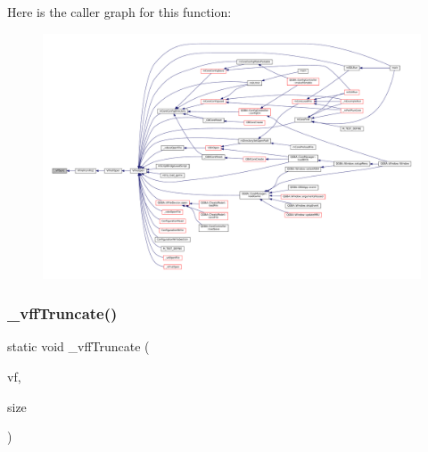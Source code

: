 Here is the caller graph for this function\+:
\nopagebreak
\begin{figure}[H]
\begin{center}
\leavevmode
\includegraphics[width=350pt]{vfs-file_8c_ad31804a57b1b09d56fcefadca87ba2d1_icgraph}
\end{center}
\end{figure}
\mbox{\label{vfs-file_8c_a44e1cdacc71a8e16868d8c968e644ec6}} 
\subsubsection{\texorpdfstring{\+\_\+vff\+Truncate()}{\_vffTruncate()}}
{\footnotesize\ttfamily static void \+\_\+vff\+Truncate (\begin{DoxyParamCaption}\item[{struct V\+File $\ast$}]{vf,  }\item[{size\+\_\+t}]{size }\end{DoxyParamCaption})\hspace{0.3cm}{\ttfamily [static]}}

